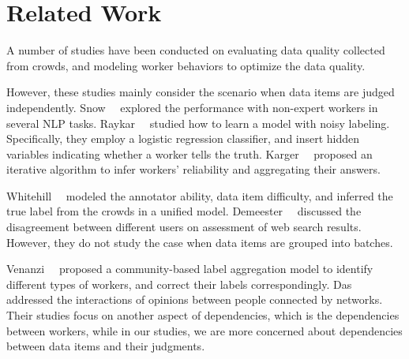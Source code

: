 \section{Related Work}
\label{sec:related}



A number of studies have been conducted on evaluating data quality collected from crowds, 
and modeling worker behaviors to optimize the data quality.  

However, these studies mainly consider the scenario when data items are judged independently.  
Snow~\etal~\cite{snow:emnlp2008} explored the performance with non-expert workers in several NLP tasks.
Raykar~\etal~\cite{raykar:nips2011ranking,raykar:icml2009,raykar:jmlr2010}
studied how to learn a model with noisy labeling. 
Specifically, they employ a logistic regression classifier, 
and insert hidden variables indicating whether a worker tells the truth. 
Karger~\etal~\cite{karger:nips2011} proposed an iterative algorithm to infer workers' reliability 
and aggregating their answers.  

Whitehill~\etal~\cite{whitehill:nips2009} modeled the annotator ability, data item difficulty, and inferred the true label from the crowds in a unified model.
Demeester~\etal~\cite{demeester:wsdm2014} discussed the disagreement between different users on assessment of web search results.
However, they do not study the case when data items are grouped into batches.

Venanzi~\etal~\cite{venanzi:www2014} proposed a community-based label aggregation model to identify different types of workers, 
and correct their labels correspondingly.  
Das~\etal~\cite{das:kdd2013} addressed the interactions of opinions between people connected by networks.
Their studies focus on another aspect of dependencies, 
which is the dependencies between workers, 
while in our studies, we are more concerned about dependencies between data items and their judgments.  


